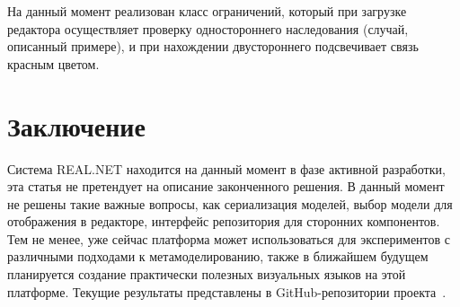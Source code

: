 \documentclass{spisok-article}
\begin{document}
На данный момент реализован класс ограничений, который при загрузке редактора осуществляет проверку одностороннего наследования (случай, описанный примере), и при нахождении двустороннего подсвечивает связь красным цветом.

\section{Заключение}

Система REAL.NET находится на данный момент в фазе активной разработки, эта статья не претендует на описание законченного решения. В данный момент не решены такие важные вопросы, как сериализация моделей, выбор модели для отображения в редакторе, интерфейс репозитория для сторонних компонентов. Тем не менее, уже сейчас платформа может использоваться для экспериментов с различными подходами к  метамоделированию, также в ближайшем будущем планируется создание практически полезных визуальных языков на этой платформе. Текущие результаты представлены в GitHub-репозитории проекта~\cite{realNetGithub}.
\end{document}
